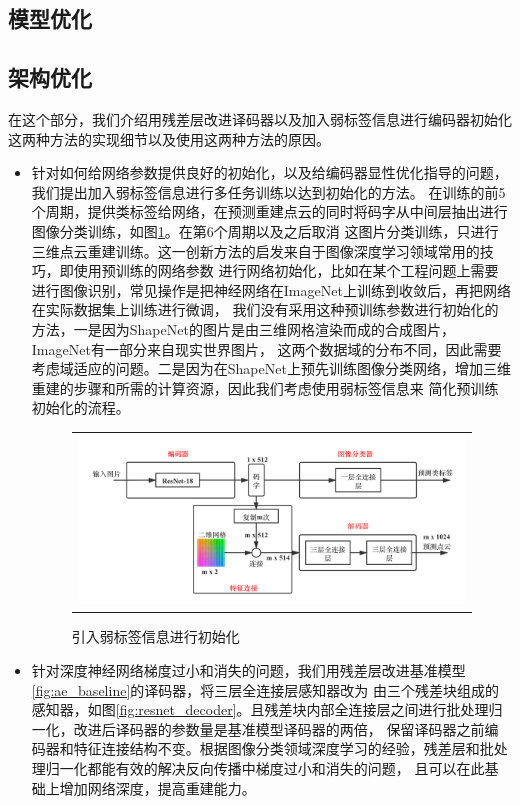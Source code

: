 \documentclass[bachelor, nocolorlinks, printoneside]{seuthesis} %
\begin{document}
\begin{Main}
\FloatBarrier
\section{模型优化}
\subsection{架构优化}\label{sec:optimal_method}
在这个部分，我们介绍用残差层改进译码器以及加入弱标签信息进行编码器初始化这两种方法的实现细节以及使用这两种方法的原因。
\begin{itemize}
    \item 针对如何给网络参数提供良好的初始化，以及给编码器显性优化指导的问题，我们提出加入弱标签信息进行多任务训练以达到初始化的方法。
    在训练的前5个周期，提供类标签给网络，在预测重建点云的同时将码字从中间层抽出进行图像分类训练，如图\ref{fig:class_init}。在第6个周期以及之后取消
    这图片分类训练，只进行三维点云重建训练。这一创新方法的启发来自于图像深度学习领域常用的技巧，即使用预训练的网络参数
    进行网络初始化，比如在某个工程问题上需要进行图像识别，常见操作是把神经网络在ImageNet上训练到收敛后，再把网络在实际数据集上训练进行微调，
    我们没有采用这种预训练参数进行初始化的方法，一是因为ShapeNet的图片是由三维网格渲染而成的合成图片，ImageNet有一部分来自现实世界图片，
    这两个数据域的分布不同，因此需要考虑域适应的问题。二是因为在ShapeNet上预先训练图像分类网络，增加三维重建的步骤和所需的计算资源，因此我们考虑使用弱标签信息来
    简化预训练初始化的流程。
    \begin{figure}
        \centering
        \begin{tabular}{c@{}}
        \includegraphics[width=0.99\columnwidth]{figs/model/ae_baseline_class.png}
        \end{tabular}
        \caption{引入弱标签信息进行初始化}
        \label{fig:class_init}
    \end{figure}

    \item 针对深度神经网络梯度过小和消失的问题，我们用残差层改进基准模型\ref{fig:ae_baseline}的译码器，将三层全连接层感知器改为
    由三个残差块组成的感知器，如图\ref{fig:resnet_decoder}。且残差块内部全连接层之间进行批处理归一化，改进后译码器的参数量是基准模型译码器的两倍，
    保留译码器之前编码器和特征连接结构不变。根据图像分类领域深度学习的经验，残差层和批处理归一化都能有效的解决反向传播中梯度过小和消失的问题，
    且可以在此基础上增加网络深度，提高重建能力。


\end{itemize}
\end{Main}
\end{document}
